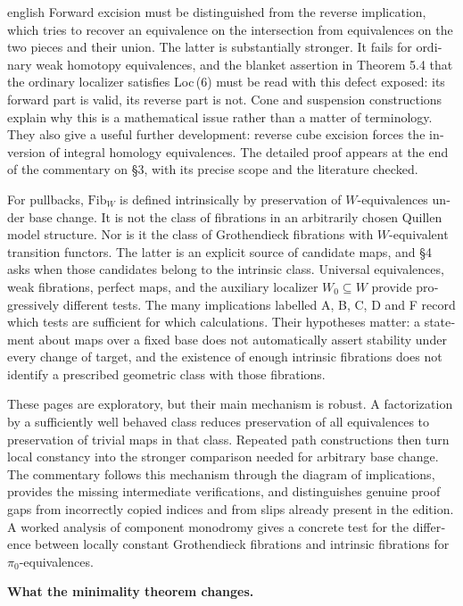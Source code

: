 \begin{otherlanguage}{english}
\begin{otherlanguage*}{english}
Forward excision must be distinguished from the reverse implication, which tries to recover an equivalence on the intersection from equivalences on the two pieces and their union. The latter is substantially stronger. It fails for ordinary weak homotopy equivalences, and the blanket assertion in Theorem 5.4 that the ordinary localizer satisfies Loc\,(6) must be read with this defect exposed: its forward part is valid, its reverse part is not. Cone and suspension constructions explain why this is a mathematical issue rather than a matter of terminology. They also give a useful further development: reverse cube excision forces the inversion of integral homology equivalences. The detailed proof appears at the end of the commentary on \S3, with its precise scope and the literature checked.

For pullbacks, $\mathrm{Fib}_W$ is defined intrinsically by preservation of $W$-equivalences under base change. It is not the class of fibrations in an arbitrarily chosen Quillen model structure. Nor is it the class of Grothendieck fibrations with $W$-equivalent transition functors. The latter is an explicit source of candidate maps, and \S4 asks when those candidates belong to the intrinsic class. Universal equivalences, weak fibrations, perfect maps, and the auxiliary localizer $W_0\subseteq W$ provide progressively different tests. The many implications labelled A, B, C, D and F record which tests are sufficient for which calculations. Their hypotheses matter: a statement about maps over a fixed base does not automatically assert stability under every change of target, and the existence of enough intrinsic fibrations does not identify a prescribed geometric class with those fibrations.

These pages are exploratory, but their main mechanism is robust. A factorization by a sufficiently well behaved class reduces preservation of all equivalences to preservation of trivial maps in that class. Repeated path constructions then turn local constancy into the stronger comparison needed for arbitrary base change. The commentary follows this mechanism through the diagram of implications, provides the missing intermediate verifications, and distinguishes genuine proof gaps from incorrectly copied indices and from slips already present in the edition. A worked analysis of component monodromy gives a concrete test for the difference between locally constant Grothendieck fibrations and intrinsic fibrations for $\pi_0$-equivalences.

\medskip\noindent\textbf{What the minimality theorem changes.}


\end{otherlanguage*}
\end{otherlanguage}
